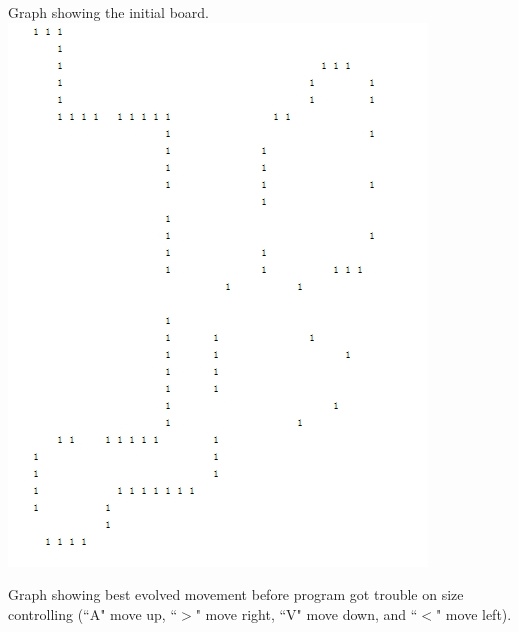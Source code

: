 \documentclass[12pt]{article} %
\begin{document}
\newpage
Graph showing the initial board.\\
\includegraphics[scale=1]{board.jpg}

\newpage
Graph showing best evolved movement before program got trouble on size controlling (``A" move up, ``$>$" move right, ``V" move down, and ``$<$" move left).\\
\end{document}
